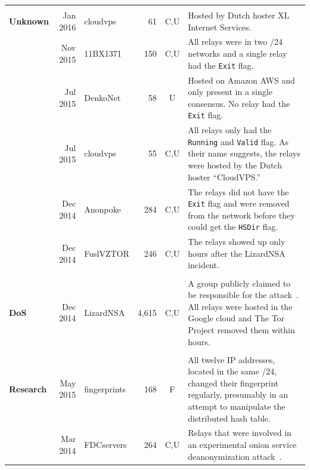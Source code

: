 \begin{table}[ht!]
\begin{tabularx}{\textwidth}{l r l r c X}
& & & & & \\

\textbf{Unknown} & Jan 2016 & cloudvps & 61 & \phantom{N,F,}C,U\phantom{,E} & Hosted by Dutch hoster XL
Internet Services. \\

& Nov 2015 & 11BX1371 & 150 & \phantom{N,F,}C,U\phantom{,E} & All relays were in two /24 networks and a
single relay had the \texttt{Exit} flag.  \\

& Jul 2015 & DenkoNet & 58 & \phantom{N,F,C,}U\phantom{,E} & Hosted on Amazon AWS and only present in a
single consensus.  No relay had the \texttt{Exit} flag. \\

& Jul 2015 & cloudvps & 55 & \phantom{N,F,}C,U\phantom{,E} & All relays only had the \texttt{Running} and
\texttt{Valid} flag.  As their name suggests, the relays were hosted by the
Dutch hoster ``CloudVPS.'' \\

& Dec 2014 & Anonpoke & 284 & \phantom{N,F,}C,U\phantom{,E} & The relays did not have the \texttt{Exit}
flag and were removed from the network before they could get the \texttt{HSDir}
flag.  \\

& Dec 2014 & FuslVZTOR & 246 & \phantom{N,F,}C,U\phantom{,E} & The relays showed up only hours after the
LizardNSA incident. \\

& & & & & \\

\textbf{DoS} & Dec 2014 & LizardNSA & 4,615 & \phantom{N,F,}C,U\phantom{,E} & A group publicly claimed to
be responsible for the attack~\cite{lizards}.  All relays were hosted in the
Google cloud and The Tor Project removed them within hours. \\

& & & & & \\

\textbf{Research} & May 2015 & fingerprints & 168 & \phantom{N,}F\phantom{,C,U,E} & All twelve IP addresses,
located in the same /24, changed their fingerprint regularly, presumably in an
attempt to manipulate the distributed hash table. \\

& Mar 2014 & FDCservers & 264 & \phantom{N,F,}C,U\phantom{,E} & Relays that were involved in an
experimental onion service deanonymization attack~\cite{cmucert}. \\


\end{tabularx}
\end{table}
